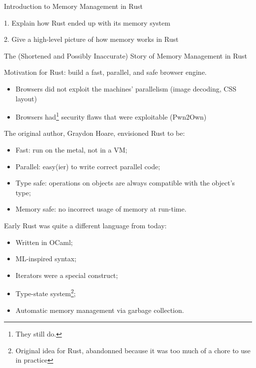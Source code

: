 \documentclass[9pt]{beamer}
\renewcommand\big[1]{
  \begin{center}
    \Large{#1}
  \end{center}
}
\begin{document}
\begin{frame}[plain]
  \centering\Huge{Introduction to Memory Management in Rust}
\end{frame}

\begin{frame}
  \big{1. Explain how Rust ended up with its memory system}

  \big{2. Give a high-level picture of how memory works in Rust}
\end{frame}

\begin{frame}
  \centering\Huge{The (Shortened and Possibly Inaccurate) Story of Memory Management in Rust}
\end{frame}

\begin{frame}
  \big{Motivation for Rust: build a fast, parallel, and safe browser engine.}

  \begin{itemize}
    \item Browsers did not exploit the machines' parallelism (image decoding, CSS layout)
    \item Browsers had\footnote{They still do.} security flaws that were exploitable (Pwn2Own)
  \end{itemize}
\end{frame}

\begin{frame}
  \big{The original author, Graydon Hoare, envisioned Rust to be:}

  \begin{itemize}
    \item Fast: run on the metal, not in a VM;
    \item Parallel: easy(ier) to write correct parallel code;
    \item Type safe: operations on objects are always compatible with the object's type;
    \item Memory safe: no incorrect usage of memory at run-time.
  \end{itemize}
\end{frame}

\begin{frame}
  \big{Early Rust was quite a different language from today:}

  \begin{itemize}
    \item Written in OCaml;
    \item ML-inspired syntax;
    \item Iterators were a special construct;
    \item Type-state system\footnote{Original idea for Rust, abandonned because it was too much of a chore to use in practice};
    \item Automatic memory management via garbage collection.
  \end{itemize}
\end{frame}
\end{document}
